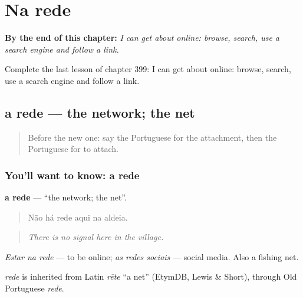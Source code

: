 
\chapter{Na rede}
\label{ch:pt-na-rede}

\begin{chapteropening}
\textbf{By the end of this chapter:} \emph{I can get about online: browse, search, use a search engine and follow a link.}

Complete the last lesson of chapter 399: I can get about online: browse, search, use a search engine and follow a link.
\end{chapteropening}

\section[a rede]{a rede — the network; the net}

\label{lesson:PT-C399-rede}



\begin{quote}
Before the new one: say the Portuguese for the attachment, then the Portuguese for to attach.
\end{quote}

\subsection*{You'll want to know: a rede}
\textbf{a rede} — \textquotedblleft{}the network; the net\textquotedblright{}.

\begin{quote}
Não há rede aqui na aldeia.
\end{quote}

\begin{quote}
\emph{There is no signal here in the village.}
\end{quote}

\emph{Estar na rede} — to be online; \emph{as redes sociais} — social media. Also a fishing net.

\begin{cousinweb}
\emph{rede} is inherited from Latin \emph{rēte} \textquotedblleft{}a net\textquotedblright{} (EtymDB, Lewis \& Short), through Old Portuguese \emph{rede}.
\end{cousinweb}

